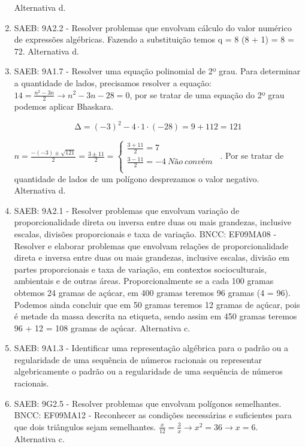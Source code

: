 \begin{enumerate}
Alternativa d.

\item
SAEB: 9A2.2 - Resolver problemas que envolvam cálculo do valor numérico
de expressões algébricas.
Fazendo a substituição temos q = 8 \cdot (8 + 1) = 8  = 72.
Alternativa d.

\item
SAEB: 9A1.7 - Resolver uma equação polinomial de
2º grau. Para determinar a quantidade de lados, precisamos resolver a
equação: $14 = \frac{n^{2} - 3n}{2} \rightarrow n^{2} - 3n - 28 = 0$,
por se tratar de uma equação do 2º grau podemos aplicar Bhaskara.

\[\mathrm{\Delta} = \left( - 3 \right)^{2} - 4 \cdot 1 \cdot \left( - 28 \right) = 9 + 112 = 121\]

$n = \frac{- ( - 3) \pm \sqrt{121}}{2} = \frac{3 \pm 11}{2} = \left\{ \begin{matrix} \frac{3 + 11}{2} = 7\ \ \ \ \ \ \ \ \ \ \ \ \ \ \ \ \ \ \ \ \ \ \ \ \ \ \ \ \ \  \\ \frac{3 - 11}{2} = - 4\ Não\ convém \\ \end{matrix} \right.\ $.
Por se tratar de quantidade de lados de um polígono desprezamos o valor
negativo. Alternativa d.

\item
SAEB: 9A2.1 - Resolver problemas que envolvam variação de
proporcionalidade direta ou inversa entre duas ou mais grandezas,
inclusive escalas, divisões proporcionais e taxa de variação.
BNCC: EF09MA08 - Resolver e elaborar problemas que envolvam relações de
proporcionalidade direta e inversa entre duas ou mais grandezas,
inclusive escalas, divisão em partes proporcionais e taxa de variação,
em contextos socioculturais, ambientais e de outras áreas.
Proporcionalmente se a cada 100 gramas obtemos 24 gramas de açúcar, em
400 gramas teremos 96 gramas (4  = 96). Podemos ainda concluir que
em 50 gramas teremos 12 gramas de açúcar, pois é metade da massa
descrita na etiqueta, sendo assim em 450 gramas teremos 96 + 12 = 108
gramas de açúcar.
Alternativa c.

\item
SAEB: 9A1.3 - Identificar uma representação algébrica para o padrão ou a
regularidade de uma sequência de números racionais ou representar
algebricamente o padrão ou a regularidade de uma sequência de números
racionais.

\item
SAEB: 9G2.5 - Resolver problemas que envolvam polígonos semelhantes.
BNCC: EF09MA12 - Reconhecer as condições necessárias e suficientes para
que dois triângulos sejam semelhantes.
$\frac{x}{12} = \frac{3}{x} \rightarrow x^{2} = 36 \rightarrow x = 6$.
Alternativa c.


\end{enumerate}
